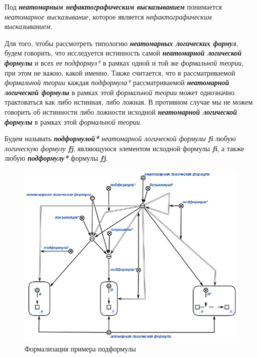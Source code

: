 Под \textbf{\textit{неатомарным нефактографическим высказыванием}} понимается \textit{неатомарное высказывание}, которое является \textit{нефактографическим высказыванием}.

Для того, чтобы рассмотреть типологию \textbf{\textit{неатомарных логических формул}}, будем говорить, что исследуется истинность самой \textbf{\textit{неатомарной логической формулы}} и всех ее \textit{подформул*} в рамках одной и той же \textit{формальной теории}, при этом не важно, какой именно. Также считается, что в рассматриваемой \textit{формальной теории} каждая \textit{подформула*} рассматриваемой \textbf{\textit{неатомарной логической формулы}} в рамках этой \textit{формальной теории} может однозначно трактоваться как либо истинная, либо ложная. В противном случае мы не можем говорить об истинности либо ложности исходной \textbf{\textit{неатомарной логической формулы}} в рамках этой \textit{формальной теории}.

Будем называть \textbf{\textit{подформулой*}} \textit{неатомарной логической формулы} \textbf{\textit{fi}} любую \textit{логическую формулу} \textbf{\textit{fj}}, являющуюся элементом исходной формулы \textbf{\textit{fi}}, а также любую \textbf{\textit{подформулу*}} формулы \textbf{\textit{fj}}.

\begin{SCn}
\end{SCn}

\begin{figure}[http]
	\includegraphics[scale=0.8]{author/part2/figures/logic/subformula.png}
	\caption{Формализация примера подформулы}
	\label{fig:modus_ponens}
\end{figure}

